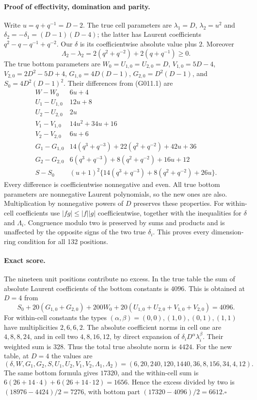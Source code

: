 \paragraph{Proof of effectivity, domination and parity.}
Write $u=q+q^{-1}=D-2$. The true cell parameters are
$\lambda_1=D$, $\lambda_2=u^2$ and
$\delta_2=-\delta_1=(D-1)(D-4)$; the latter has Laurent
coefficients $q^2-q-q^{-1}+q^{-2}$.
Our $\delta$ is its coefficientwise absolute value plus $2$.
Moreover
\[
 \Lambda_2-\lambda_2=2(q^2+q^{-2})+2(q+q^{-1})\ge0.
\]
The true bottom parameters are
$W_0=U_{1,0}=U_{2,0}=D$,
$V_{1,0}=5D-4$, $V_{2,0}=2D^2-5D+4$,
$G_{1,0}=4D(D-1)$, $G_{2,0}=D^2(D-1)$, and
$S_0=4D^2(D-1)^2$. Their differences from (G011.1) are
\[
 \begin{array}{c|l}
 W-W_0&6u+4\\
 U_1-U_{1,0}&12u+8\\
 U_2-U_{2,0}&2u\\
 V_1-V_{1,0}&14u^2+34u+16\\
 V_2-V_{2,0}&6u+6\\
 G_1-G_{1,0}&14(q^3+q^{-3})+22(q^2+q^{-2})+42u+36\\
 G_2-G_{2,0}&6(q^3+q^{-3})+8(q^2+q^{-2})+16u+12\\
 S-S_0&(u+1)^2\{14(q^3+q^{-3})+8(q^2+q^{-2})+26u\}.
 \end{array}                                               \tag{G011.3}
\]
Every difference is coefficientwise nonnegative and even.
All true bottom parameters are nonnegative Laurent
polynomials, so the new ones are also. Multiplication by
nonnegative powers of $D$ preserves these properties.
For within-cell coefficients use
$|fg|\le|f||g|$ coefficientwise, together with the inequalities
for $\delta$ and $\Lambda_i$. Congruence modulo two is
preserved by sums and products and is unaffected by the
opposite signs of the two true $\delta_i$. This proves every
dimension-ring condition for all 132 positions.

\paragraph{Exact score.}
The nineteen unit positions contribute no excess. In the
true table the sum of absolute Laurent coefficients of the
bottom constants is $4096$. This is obtained at $D=4$ from
\[
 S_0+20(G_{1,0}+G_{2,0})+200W_0
           +20(U_{1,0}+U_{2,0}+V_{1,0}+V_{2,0})=4096.
\]
For within-cell constants the types
$(\alpha,\beta)=(0,0),(1,0),(0,1),(1,1)$ have multiplicities
$2,6,6,2$. The absolute coefficient norms in cell one are
$4,8,8,24$, and in cell two $4,8,16,12$, by direct expansion
of $\delta_iD^\alpha\lambda_i^\beta$. Their weighted sum is
$328$. Thus the total true absolute norm is $4424$.
For the new table, at $D=4$ the values are
\[
 (\delta,W,G_1,G_2,S,U_1,U_2,V_1,V_2,\Lambda_1,\Lambda_2)
 =(6,20,240,120,1440,36,8,156,34,4,12).
\]
The same bottom formula gives $17320$, and the within-cell
sum is $6(26+14\cdot4)+6(26+14\cdot12)=1656$.
Hence the excess divided by two is
$(18976-4424)/2=7276$, with bottom part
$(17320-4096)/2=6612$.\hfill$\square$

